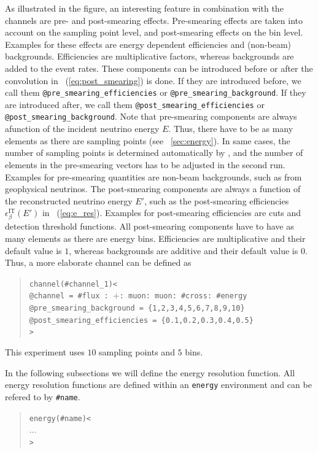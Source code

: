 As illustrated in the figure, an interesting feature in combination with the
channels are pre- and post-smearing effects. Pre-smearing effects are taken into account on the sampling point level, and post-smearing effects on the bin level. Examples for these effects are energy 
dependent efficiencies and (non-beam) backgrounds. Efficiencies are multiplicative factors, whereas backgrounds are added to the event rates. These components can be introduced before or after the convolution in \eq~(\ref{eq:post_smearing}) is done. If they are introduced before, 
we call them
{\tt @pre\_smearing\_efficiencies} or {\tt @pre\_smearing\_background}. 
If they are introduced after, we call them {\tt @post\_smearing\_efficiencies} or {\tt @post\_smearing\_background}.
Note that pre-smearing components are always afunction of the incident neutrino energy $E$. Thus, there have to be as  many elements as there are sampling points (see \Sec~\ref{sec:energy}). In same cases, the number of sampling points is determined automatically by \GLOBES , and the number of elements in the  pre-smearing vectors has to be adjusted in the second run.
Examples for pre-smearing quantities are non-beam backgrounds, such as from geophysical neutrinos. The post-smearing components are always a function of the reconstructed neutrino energy $E'$, such as the post-smearing efficiencies $\epsilon_\beta^{\text{IT}}(E')$ in \eq~(\ref{eq:e_res}). Examples for post-smearing efficiencies are cuts and detection threshold functions. All post-smearing components have to have as 
many elements as there are energy bins. Efficiencies are multiplicative 
and their default value is $1$, whereas backgrounds are additive and their default value is $0$. Thus, a more elaborate channel can be defined as
\begin{quote}
{\tt channel(\#channel\_1)<\\
\tb @channel = \#flux : $+$: muon: muon: \#cross: \#energy\\
\tb @pre\_smearing\_background = \{1,2,3,4,5,6,7,8,9,10\}\\
\tb @post\_smearing\_efficiencies = \{0.1,0.2,0.3,0.4,0.5\}\\
>}
\end{quote}
This experiment uses $10$ sampling points and $5$ bins.

In the following subsections we will define the energy resolution function.
All energy resolution functions are defined within an {\tt energy} environment and can be refered to by {\tt \#name}.
\begin{quote}
  {\tt energy(\#name)<\\
\tb $\ldots$\\
>}
\end{quote}

